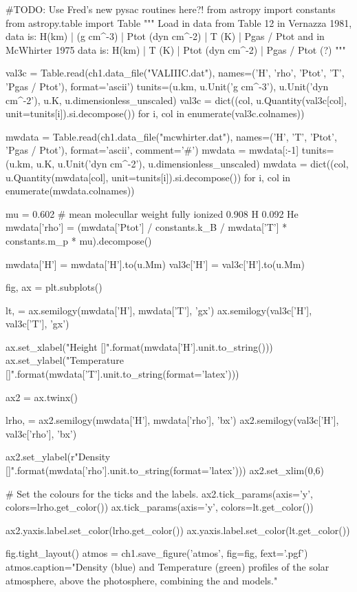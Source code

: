 \begin{pycode}[chapter1]
#TODO: Use Fred's new pysac routines here?!
from astropy import constants
from astropy.table import Table
"""
Load in data from Table 12 in Vernazza 1981,
data is:
    H(km) | \rho (g cm^-3) | Ptot (dyn cm^-2) | T (K) | Pgas / Ptot
and in McWhirter 1975 data is:
    H(km) | T (K)          | Ptot (dyn cm^-2) | Pgas / Ptot (?)
"""

val3c = Table.read(ch1.data_file("VALIIIC.dat"),
				  names=('H', 'rho', 'Ptot', 'T', 'Pgas / Ptot'),
				  format='ascii')
tunits=(u.km, u.Unit('g cm^-3'), u.Unit('dyn cm^-2'), u.K, u.dimensionless_unscaled)
val3c = dict((col, u.Quantity(val3c[col], unit=tunits[i]).si.decompose()) for i, col in enumerate(val3c.colnames))

mwdata = Table.read(ch1.data_file("mcwhirter.dat"),
				  names=('H', 'T', 'Ptot', 'Pgas / Ptot'),
				  format='ascii', comment='#')
mwdata = mwdata[:-1]
tunits=(u.km, u.K, u.Unit('dyn cm^-2'), u.dimensionless_unscaled)
mwdata = dict((col, u.Quantity(mwdata[col], unit=tunits[i]).si.decompose()) for i, col in enumerate(mwdata.colnames))

mu = 0.602  # mean molecullar weight fully ionized 0.908 H 0.092 He
mwdata['rho'] = (mwdata['Ptot'] / constants.k_B / mwdata['T'] * constants.m_p * mu).decompose()

mwdata['H'] = mwdata['H'].to(u.Mm)
val3c['H'] = val3c['H'].to(u.Mm)

fig, ax = plt.subplots()

lt, = ax.semilogy(mwdata['H'], mwdata['T'], 'gx')
ax.semilogy(val3c['H'], val3c['T'], 'gx')

ax.set_xlabel("Height [{}]".format(mwdata['H'].unit.to_string()))
ax.set_ylabel("Temperature [{}]".format(mwdata['T'].unit.to_string(format='latex')))

ax2 = ax.twinx()

lrho, = ax2.semilogy(mwdata['H'], mwdata['rho'], 'bx')
ax2.semilogy(val3c['H'], val3c['rho'], 'bx')

ax2.set_ylabel(r"Density [{}]".format(mwdata['rho'].unit.to_string(format='latex')))
ax2.set_xlim(0,6)

# Set the colours for the ticks and the labels.
ax2.tick_params(axis='y', colors=lrho.get_color())
ax.tick_params(axis='y', colors=lt.get_color())

ax2.yaxis.label.set_color(lrho.get_color())
ax.yaxis.label.set_color(lt.get_color())

fig.tight_layout()
atmos = ch1.save_figure('atmos', fig=fig, fext='.pgf')
atmos.caption="Density (blue) and Temperature (green) profiles of the solar atmosphere, above the photosphere, combining the \cite{mcwhirter1975} and \cite{vernazza1981} models."
\end{pycode}

